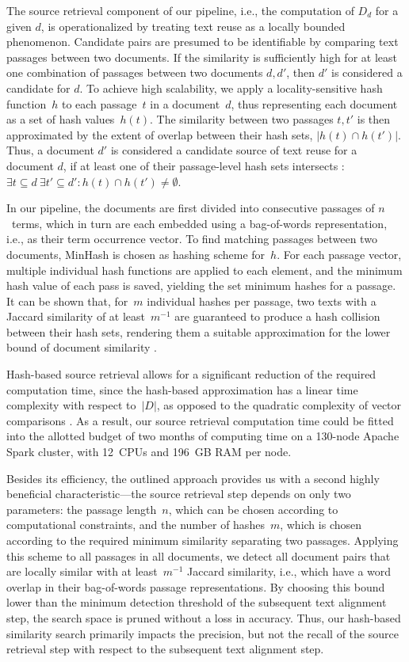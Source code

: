 The source retrieval component of our pipeline, i.e., the computation of $D_d$ for a given $d$, is operationalized by treating text reuse as a locally bounded phenomenon. Candidate pairs are presumed to be identifiable by comparing text passages between two documents. If the similarity is sufficiently high for at least one combination of passages between two documents $d, d'$, then $d'$ is considered a candidate for $d$. To achieve high scalability, we apply a locality-sensitive hash function~$h$ to each passage~$t$ in a document~$d$, thus representing each document as a set of hash values~$h(t)$. The similarity between two passages $t,t'$ is then approximated by the extent of overlap between their hash sets, $|h(t)\cap h(t')|$. Thus, a document $d'$ is considered a candidate source of text reuse for a document $d$, if at least one of their passage-level hash sets intersects \cite{stein:2019c}: $\exists t \subseteq d \ \exists t' \subseteq d' : h(t) \cap h(t')\neq\emptyset$. 

In our pipeline, the documents are first divided into consecutive passages of $n$~terms, which in turn are each embedded using a bag-of-words representation, i.e., as their term occurrence vector. To find matching passages between two documents, MinHash \cite{broder:97} is chosen as hashing scheme for~$h$. For each passage vector, multiple individual hash functions are applied to each element, and the minimum hash value of each pass is saved, yielding the set minimum hashes for a passage. It can be shown that, for~$m$ individual hashes per passage, two texts with a Jaccard similarity of at least~$m^{-1}$ are guaranteed to produce a hash collision between their hash sets, rendering them a suitable approximation for the lower bound of document similarity \cite{broder:97}.

Hash-based source retrieval allows for a significant reduction of the required computation time, since the hash-based approximation has a linear time complexity with respect to~$|D|$, as opposed to the quadratic complexity of vector comparisons \cite{stein:2019c}. As a result, our source retrieval computation time could be fitted into the allotted budget of two months of computing time on a 130-node Apache Spark cluster, with 12~CPUs and 196~GB RAM per node. 

Besides its efficiency, the outlined approach provides us with a second highly beneficial characteristic---the source retrieval step depends on only two parameters: the passage length~$n$, which can be chosen according to computational constraints, and the number of hashes~$m$, which is chosen according to the required minimum similarity separating two passages. Applying this scheme to all passages in all documents, we detect all document pairs that are locally similar with at least~$m^{-1}$ Jaccard similarity, i.e., which have a word overlap in their bag-of-words passage representations. By choosing this bound lower than the minimum detection threshold of the subsequent text alignment step, the search space is pruned without a loss in accuracy. Thus, our hash-based similarity search primarily impacts the precision, but not the recall of the source retrieval step with respect to the subsequent text alignment step.



